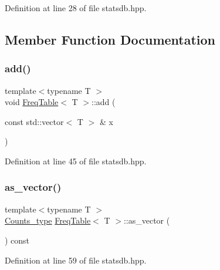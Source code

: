 Definition at line 28 of file statsdb.\+hpp.



\subsection{Member Function Documentation}
\mbox{\label{class_freq_table_a919e08556ba3aa9535a64827315bb89a}} 
\subsubsection{\texorpdfstring{add()}{add()}}
{\footnotesize\ttfamily template$<$typename T $>$ \\
void \hyperlink{class_freq_table}{Freq\+Table}$<$ T $>$\+::add (\begin{DoxyParamCaption}\item[{const std\+::vector$<$ T $>$ \&}]{x }\end{DoxyParamCaption})\hspace{0.3cm}{\ttfamily [inline]}}



Definition at line 45 of file statsdb.\+hpp.

\mbox{\label{class_freq_table_a1898e62605d8753e170189936d403e05}} 
\subsubsection{\texorpdfstring{as\+\_\+vector()}{as\_vector()}}
{\footnotesize\ttfamily template$<$typename T $>$ \\
\hyperlink{typedefs_8hpp_aee40fa17c1fddb63dd1f2b1470ade95b}{Counts\+\_\+type} \hyperlink{class_freq_table}{Freq\+Table}$<$ T $>$\+::as\+\_\+vector (\begin{DoxyParamCaption}{ }\end{DoxyParamCaption}) const\hspace{0.3cm}{\ttfamily [inline]}}



Definition at line 59 of file statsdb.\+hpp.

\mbox{\label{class_freq_table_a326660096e4309780aea8355d0f74ac7}} 
